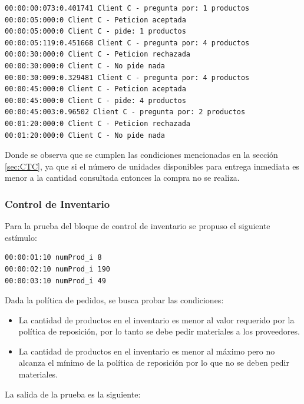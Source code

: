 \documentclass[10pt]{article}
\begin{document}
\begin{minipage}{1\textwidth}
	\centering
	\begin{lstlisting}
00:00:00:073:0.401741 Client C - pregunta por: 1 productos
00:00:05:000:0 Client C - Peticion aceptada
00:00:05:000:0 Client C - pide: 1 productos
00:00:05:119:0.451668 Client C - pregunta por: 4 productos
00:00:30:000:0 Client C - Peticion rechazada
00:00:30:000:0 Client C - No pide nada
00:00:30:009:0.329481 Client C - pregunta por: 4 productos
00:00:45:000:0 Client C - Peticion aceptada
00:00:45:000:0 Client C - pide: 4 productos
00:00:45:003:0.96502 Client C - pregunta por: 2 productos
00:01:20:000:0 Client C - Peticion rechazada
00:01:20:000:0 Client C - No pide nada
	\end{lstlisting}
	
\end{minipage}

Donde se observa que se cumplen las condiciones mencionadas en la sección \ref{sec:CTC}, ya que si el número de unidades disponibles para entrega inmediata es menor a la cantidad consultada entonces la compra no se realiza.

\subsubsection{Control de Inventario}
Para la prueba del bloque de control de inventario se propuso el siguiente estímulo:

\begin{minipage}{1\textwidth}
	\centering
	\begin{lstlisting}
00:00:01:10 numProd_i 8
00:00:02:10 numProd_i 190
00:00:03:10 numProd_i 49
	\end{lstlisting}
\end{minipage}

Dada la política de pedidos, se busca probar las condiciones:
\begin{itemize}
\item La cantidad de productos en el inventario es menor al valor requerido por la política de reposición, por lo tanto se debe pedir materiales a los proveedores.
\item  La cantidad de productos en el inventario es menor al máximo pero no alcanza el mínimo de la política de reposición por lo que no se deben pedir materiales.
\end{itemize}

La salida de la prueba es la siguiente:
\end{document}
